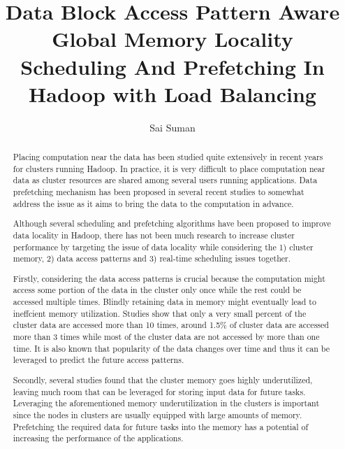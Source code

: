 \documentclass[print,ms]{nuthesis}%
\begin{document}
\frontmatter
\title{Data Block Access Pattern Aware Global Memory Locality Scheduling And Prefetching In Hadoop with Load Balancing}
\author{Sai Suman}

\maketitle

\begin{abstract}
\label{sec:summary}
\par Placing computation near the data has been studied quite extensively in recent years for clusters running Hadoop.  In practice, it is very difficult to place computation near data as cluster resources are shared among several users running applications.
Data prefetching mechanism has been proposed in several recent studies to somewhat address the issue as it aims to bring the data to the computation in advance.

\par Although several scheduling and prefetching algorithms have been proposed to improve data locality in Hadoop, there has not been much research to increase cluster performance by targeting the issue of data locality while considering the 1) cluster memory, 2) data access patterns and 3) real-time scheduling issues together.

\par Firstly, considering the data access patterns is crucial because the computation might access some portion of the data in the cluster only once while the rest could be accessed multiple times. Blindly retaining data in memory might eventually lead to ineffcient memory utilization. Studies show that only a very small percent of the cluster data are accessed more than 10 times, around 1.5\% of cluster data are accessed more than 3 times while most of the cluster data are not accessed by more than one time. It is also known that popularity of the data changes over time and thus it can be leveraged to predict the future access patterns. 

\par Secondly, several studies found that the cluster memory goes highly underutilized, leaving much room that can be leveraged for storing input data for future tasks. Leveraging the aforementioned memory underutilization in the clusters is important since the nodes in clusters are usually equipped with large amounts of memory. Prefetching the required data for future tasks into the memory has a potential of increasing the performance of the applications.


\end{abstract}
\end{document}
